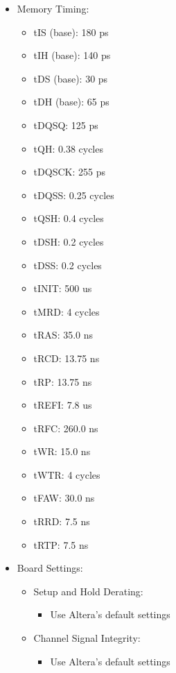 \begin{enumerate}
{\begin{itemize}
\begin{itemize}
\begin{itemize}
\item			Selfrefresh temperature: Normal
\item			Memory write CAS latency setting: 8
\item			Dynamic ODT (\texttt{Rtt\_WR}) value: RZQ/4
\end{itemize}
\end{itemize}
\item	Memory Timing:
\begin{itemize}
\item		tIS (base): 180 ps
\item		tIH (base): 140 ps
\item		tDS (base): 30 ps
\item		tDH (base): 65 ps
\item		tDQSQ: 125 ps
\item		tQH: 0.38 cycles
\item		tDQSCK: 255 ps
\item		tDQSS: 0.25 cycles
\item		tQSH: 0.4 cycles
\item		tDSH: 0.2 cycles
\item		tDSS: 0.2 cycles
\item		tINIT: 500 us
\item		tMRD: 4 cycles
\item		tRAS: 35.0 ns
\item		tRCD: 13.75 ns
\item		tRP: 13.75 ns
\item		tREFI: 7.8 us
\item		tRFC: 260.0 ns
\item		tWR: 15.0 ns
\item		tWTR: 4 cycles
\item		tFAW: 30.0 ns
\item		tRRD: 7.5 ns
\item		tRTP: 7.5 ns
\end{itemize}
\item	Board Settings:
\begin{itemize}
\item		Setup and Hold Derating:
\begin{itemize}
\item			Use Altera's default settings
\end{itemize}
\item		Channel Signal Integrity:
\begin{itemize}
\item			Use Altera's default settings
\end{itemize}

\end{itemize}
\end{itemize}}
\end{enumerate}
